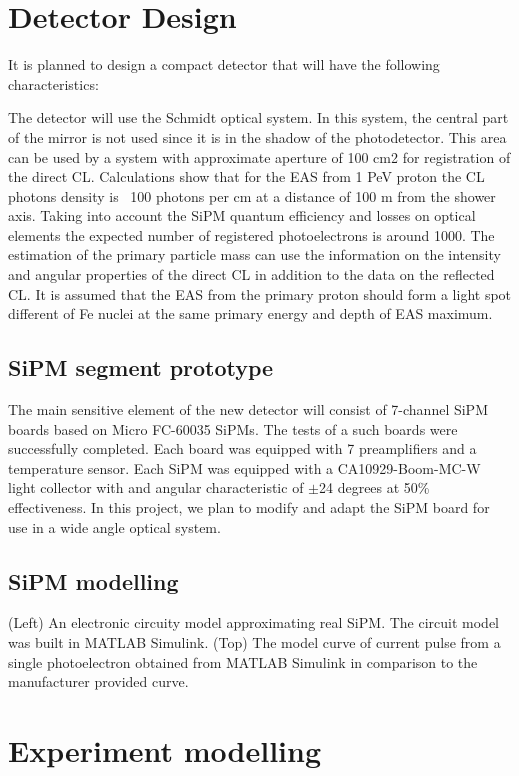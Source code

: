 \documentclass[a4paper]{jpconf}
\begin{document}
\section{Detector Design}
It is planned to design a compact detector that will have the following characteristics:

The detector will use the Schmidt optical system. In this system, the central part of the mirror is not used since it is in the shadow of the photodetector. This area can be used by a system with approximate aperture of 100 cm2 for registration of the direct CL. Calculations show that for the EAS from 1 PeV proton the CL photons density is ~100 photons per cm at a distance of 100 m from the shower axis. Taking into account the SiPM quantum efficiency and losses on optical elements the expected number of registered photoelectrons is around 1000. The estimation of the primary particle mass can use the information on the intensity and angular properties of the direct CL in addition to the data on the reflected CL. It is assumed that the EAS from the primary proton should form a light spot different of Fe nuclei at the same primary energy and depth of EAS maximum.

\subsection{SiPM segment prototype }
The main sensitive element of the new detector will consist of 7-channel SiPM boards based on Micro FC-60035 SiPMs. The tests of a such boards were successfully completed. Each board was equipped with 7 preamplifiers and a temperature sensor. Each SiPM was equipped with a CA10929-Boom-MC-W light collector with and angular characteristic of $\pm$24 degrees at 50\% effectiveness. In this project, we plan to modify and adapt the SiPM board for use in a wide angle optical system.

\subsection{SiPM modelling}
(Left) An electronic circuity model approximating real SiPM. The circuit model was built in MATLAB Simulink. (Top) The model curve of current pulse from a single photoelectron obtained from MATLAB Simulink in comparison to the manufacturer provided curve.

\section{Experiment modelling}
\end{document}
